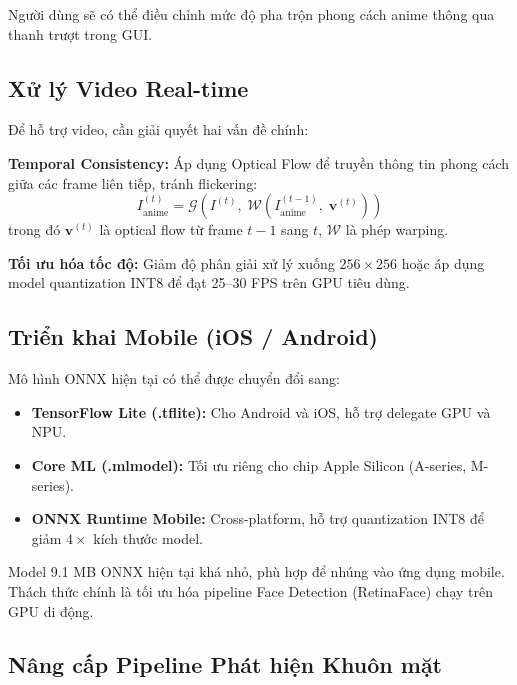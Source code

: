 Người dùng sẽ có thể điều chỉnh mức độ pha trộn phong cách anime thông qua thanh trượt trong GUI.

\subsection{Xử lý Video Real-time}
\label{subsec:future_video}

Để hỗ trợ video, cần giải quyết hai vấn đề chính:

\textbf{Temporal Consistency:} Áp dụng Optical Flow \cite{Horn1981opticalflow} để truyền thông tin phong cách giữa các frame liên tiếp, tránh flickering:
\begin{equation}
\label{eq:temporal}
I_{\text{anime}}^{(t)} = \mathcal{G}\!\left(I^{(t)},\; \mathcal{W}\!\left(I_{\text{anime}}^{(t-1)},\; \mathbf{v}^{(t)}\right)\right)
\end{equation}
trong đó $\mathbf{v}^{(t)}$ là optical flow từ frame $t-1$ sang $t$, $\mathcal{W}$ là phép warping.

\textbf{Tối ưu hóa tốc độ:} Giảm độ phân giải xử lý xuống $256\times256$ hoặc áp dụng model quantization INT8 để đạt 25--30 FPS trên GPU tiêu dùng.

\subsection{Triển khai Mobile (iOS / Android)}
\label{subsec:future_mobile}

Mô hình ONNX hiện tại có thể được chuyển đổi sang:
\begin{itemize}
    \item \textbf{TensorFlow Lite (.tflite):} Cho Android và iOS, hỗ trợ delegate GPU và NPU.
    \item \textbf{Core ML (.mlmodel):} Tối ưu riêng cho chip Apple Silicon (A-series, M-series).
    \item \textbf{ONNX Runtime Mobile:} Cross-platform, hỗ trợ quantization INT8 để giảm $4\times$ kích thước model.
\end{itemize}

Model 9.1 MB ONNX hiện tại khá nhỏ, phù hợp để nhúng vào ứng dụng mobile. Thách thức chính là tối ưu hóa pipeline Face Detection (RetinaFace) chạy trên GPU di động.

\subsection{Nâng cấp Pipeline Phát hiện Khuôn mặt}
\label{subsec:future_detection}

